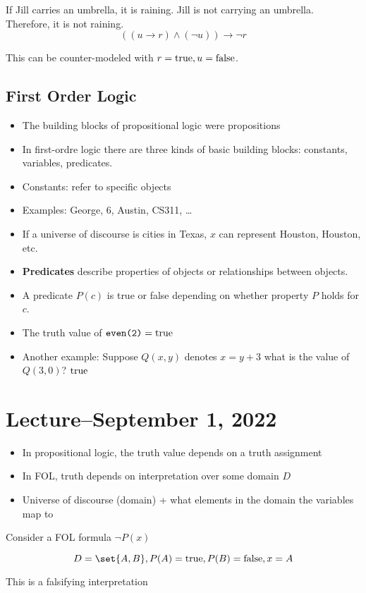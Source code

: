 \begin{example}
	If Jill carries an umbrella, it is raining. Jill is not carrying an umbrella. Therefore, it is not raining.
	\[
		((u\rightarrow r)\land (\neg u))\rightarrow \neg r
	\]

	This can be counter-modeled with $r=\text{true}, u=\text{false}$.
\end{example}

\subsection{First Order Logic}
\begin{itemize}
	\item The building blocks of propositional logic were propositions
	\item In first-ordre logic there are three kinds of basic building blocks:
	      constants, variables, predicates.
	\item Constants: refer to specific objects
	\item Examples: George, 6, Austin, CS311, \ldots
	\item If a universe of discourse is cities in Texas, $x$ can represent Houston,
	      Houston, etc.
	\item \textbf{Predicates} describe properties of objects or relationships between objects.
	\item A predicate $P(c)$ is true or false depending on whether property
	      $P$ holds for $c$.
	\item The truth value of $\texttt{even(2)} = \text{true}$
	\item Another example: Suppose $Q(x, y)$ denotes $x=y+3$ what is the value of
	      $Q(3, 0)$? $\text{true}$
\end{itemize}

\section{Lecture--September 1, 2022}
\begin{itemize}
	\item In propositional logic, the truth value depends on a truth assignment
	\item In FOL, truth depends on interpretation over some domain $D$
	\item Universe of discourse (domain) + what elements in the domain the variables map to
\end{itemize}

\begin{example}
	Consider a FOL formula $\neg P(x)$

	\[D=\set{A, B}, P(A)=\true, P(B)=\false, x=A\]

	This is a falsifying interpretation
\end{example}

